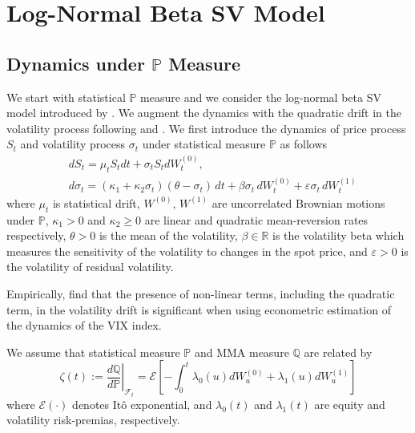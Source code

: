 \documentclass[11pt,a4paper] {article}
\begin{document}
\section{Log-Normal Beta SV Model}\label{sec:model_dynam}

\subsection{Dynamics under $\mathbb{P}$ Measure}\label{sec:logsv_quadrift}

We start with statistical $\mathbb{P}$ measure and we consider the log-normal beta SV model introduced by \cite{Sepp2012}. We augment the dynamics with the quadratic drift in the volatility process following \cite{Lewis2019} and \cite{CarrWill}. 
We first introduce the dynamics of price process $S_{t}$ and volatility process $\sigma_{t}$ under statistical measure $\mathbb{P}$ as follows
\begin{equation}\label{eq:logsv_quadrift_P}
\begin{split}
&dS_t= \mu_{t}S_{t}dt+\sigma_t S_{t} dW^{(0)}_t,\\
&d\sigma_t=(\kappa_1+\kappa_2\sigma_t)(\theta-\sigma_t)\,dt+\beta\sigma_t\,dW^{(0)}_t+\varepsilon\sigma_t\,dW^{(1)}_t
\end{split}
\end{equation}
where $\mu_{t}$ is statistical drift, $W^{(0)}$, $W^{(1)}$ are uncorrelated Brownian motions under $\mathbb{P}$, $\kappa_1>0$ and $\kappa_2 \geq 0$ are linear and quadratic mean-reversion rates respectively, $\theta>0$ is the mean of the volatility, $\beta\in\mathbb{R}$ is the volatility beta which measures the sensitivity of the volatility to changes in the spot price, and $\varepsilon>0$ is the volatility of residual volatility.

Empirically, \cite{Bakshi2006} find that the presence of non-linear terms, including the quadratic term, in the volatility drift is significant when using econometric estimation of the dynamics of the VIX index.

We assume that statistical measure $\mathbb{P}$ and MMA measure $\mathbb{Q}$ are related by
\begin{equation}\label{eq:RadonNikodym_logsv_quad}
\zeta(t):=\left.\frac{d\mathbb{Q}}{d\mathbb{P}}\right|_{\mathcal{F}_t}=\mathcal{E}\left[-\int_0^t \lambda_0(u)dW^{(0)}_u+\lambda_1(u)dW^{(1)}_u\right]
\end{equation}
where $\mathcal{E}(\cdot)$ denotes It\^{o} exponential, and $\lambda_0(t)$ and $\lambda_1(t)$ are equity and volatility risk-premias, respectively.
\end{document}
